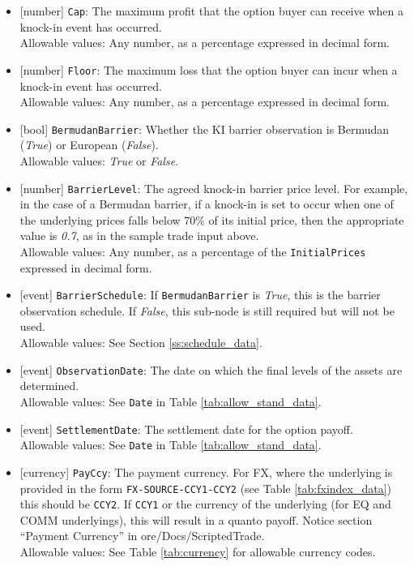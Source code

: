 \begin{itemize}
  \item{}[number] \lstinline!Cap!: The maximum profit that the option buyer can receive when a knock-in event has
  occurred. \\
  Allowable values: Any number, as a percentage expressed in decimal form.
  \item{}[number] \lstinline!Floor!: The maximum loss that the option buyer can incur when a knock-in event has
  occurred. \\
  Allowable values: Any number, as a percentage expressed in decimal form.
  \item{}[bool] \lstinline!BermudanBarrier!: Whether the KI barrier observation is Bermudan (\emph{True}) or European
  (\emph{False}). \\
  Allowable values: \emph{True} or \emph{False}.
  \item{}[number] \lstinline!BarrierLevel!: The agreed knock-in barrier price level. For example, in the case of a Bermudan barrier, if a knock-in is set to occur when one of the underlying prices falls below 70\% of its initial price, then the appropriate value is \emph{0.7}, as in the sample trade input above. \\
  Allowable values: Any number, as a percentage of the \lstinline!InitialPrices! expressed in decimal form.
  \item{}[event] \lstinline!BarrierSchedule!: If \lstinline!BermudanBarrier! is \emph{True}, this is the barrier observation
  schedule. If \emph{False}, this sub-node is still required but will not be used. \\
  Allowable values: See Section \ref{ss:schedule_data}.
  \item{}[event] \lstinline!ObservationDate!: The date on which the final levels of the assets are determined. \\
  Allowable values: See \lstinline!Date! in Table \ref{tab:allow_stand_data}.
  \item{}[event] \lstinline!SettlementDate!: The settlement date for the option payoff. \\
  Allowable values: See \lstinline!Date! in Table \ref{tab:allow_stand_data}.
  \item{}[currency] \lstinline!PayCcy!: The payment currency. For FX, where the underlying is provided
      in the form \lstinline!FX-SOURCE-CCY1-CCY2! (see Table \ref{tab:fxindex_data}) this should
      be \lstinline!CCY2!. If \lstinline!CCY1! or the currency of the underlying (for EQ and
      COMM underlyings), this will result in a quanto payoff. Notice section ``Payment Currency'' in ore/Docs/ScriptedTrade. \\
        Allowable values: See Table \ref{tab:currency} for allowable currency codes.
\end{itemize}

